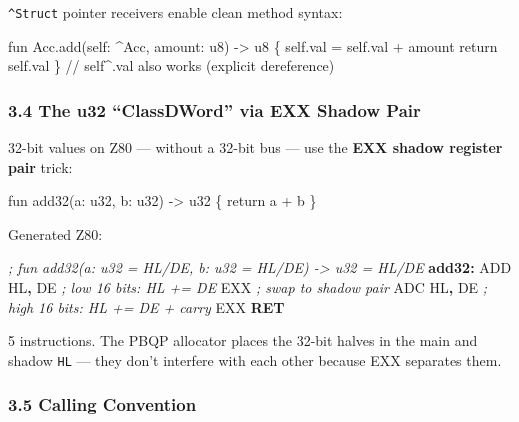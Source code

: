 \documentclass[
  11pt,
  a4paper,
]{report}
\newenvironment{Shaded}{\begin{snugshade}\small}{\end{snugshade}}
\newcommand{\BuiltInTok}[1]{#1}
\newcommand{\CommentTok}[1]{\textcolor[rgb]{0.56,0.35,0.01}{\textit{#1}}}
\newcommand{\ControlFlowTok}[1]{\textcolor[rgb]{0.13,0.29,0.53}{\textbf{#1}}}
\newcommand{\FunctionTok}[1]{\textcolor[rgb]{0.13,0.29,0.53}{\textbf{#1}}}
\newcommand{\NormalTok}[1]{#1}
\newcommand{\OperatorTok}[1]{\textcolor[rgb]{0.81,0.36,0.00}{\textbf{#1}}}
\begin{document}
\texttt{\^{}Struct} pointer receivers enable clean method syntax:

\begin{Shaded}
\begin{Highlighting}[]
\NormalTok{fun Acc.add(self: \^{}Acc, amount: u8) {-}\textgreater{} u8 \{}
\NormalTok{    self.val = self.val + amount}
\NormalTok{    return self.val}
\NormalTok{\}}
\NormalTok{// self\^{}.val also works (explicit dereference)}
\end{Highlighting}
\end{Shaded}

\subsubsection{3.4 The u32 ``ClassDWord'' via EXX Shadow
Pair}\label{the-u32-classdword-via-exx-shadow-pair}

32-bit values on Z80 --- without a 32-bit bus --- use the \textbf{EXX
shadow register pair} trick:

\begin{Shaded}
\begin{Highlighting}[]
\NormalTok{fun add32(a: u32, b: u32) {-}\textgreater{} u32 \{ return a + b \}}
\end{Highlighting}
\end{Shaded}

Generated Z80:

\begin{Shaded}
\begin{Highlighting}[]
\CommentTok{; fun add32(a: u32 = HL/DE\textquotesingle{}, b: u32 = HL\textquotesingle{}/DE) {-}\textgreater{} u32 = HL/DE}
\FunctionTok{add32:}
    \BuiltInTok{ADD}\NormalTok{ HL}\OperatorTok{,}\NormalTok{ DE      }\CommentTok{; low 16 bits: HL += DE}
\NormalTok{    EXX             }\CommentTok{; swap to shadow pair}
    \BuiltInTok{ADC}\NormalTok{ HL}\OperatorTok{,}\NormalTok{ DE      }\CommentTok{; high 16 bits: HL\textquotesingle{} += DE\textquotesingle{} + carry}
\NormalTok{    EXX}
    \ControlFlowTok{RET}
\end{Highlighting}
\end{Shaded}

5 instructions. The PBQP allocator places the 32-bit halves in the main
and shadow \texttt{HL} --- they don't interfere with each other because
EXX separates them.

\subsubsection{3.5 Calling Convention}\label{calling-convention}
\end{document}
